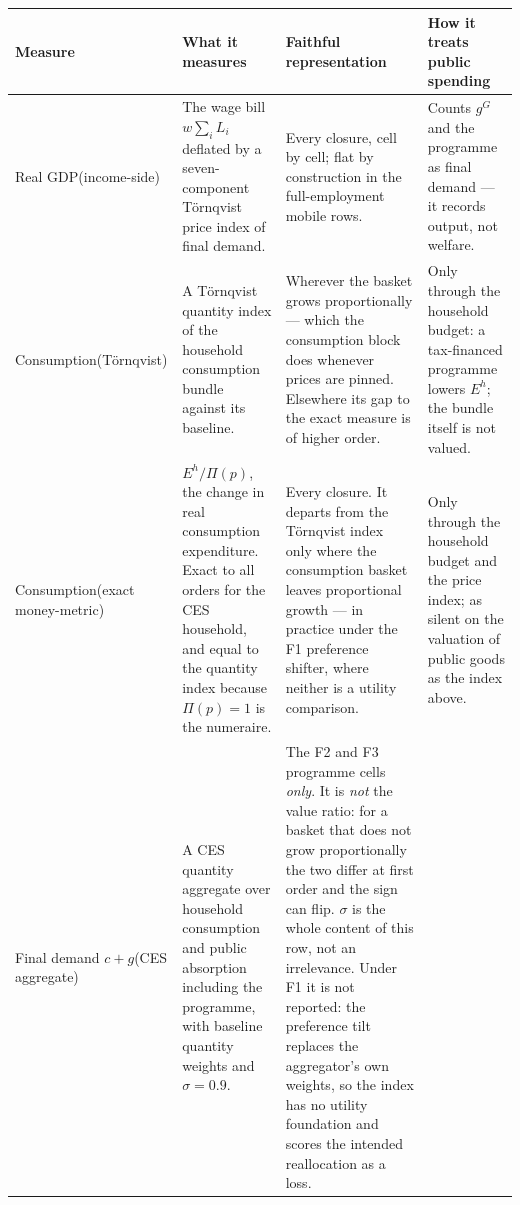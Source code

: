 \begin{table}[htbp]
\centering
\footnotesize
\setlength{\tabcolsep}{3pt}
\renewcommand{\arraystretch}{1.25}
\begin{tabular}{@{}>{\raggedright\arraybackslash}p{1.85cm}>{\raggedright\arraybackslash}p{3.9cm}>{\raggedright\arraybackslash}p{4.3cm}>{\raggedright\arraybackslash}p{4.3cm}@{}}
\toprule
\textbf{Measure} & \textbf{What it measures} & \textbf{Faithful representation} & \textbf{How it treats public spending} \\
\midrule
Real GDP\newline \scriptsize (income-side)
& The wage bill $w\sum_i L_i$ deflated by a seven-component T\"ornqvist price index of final demand.
& Every closure, cell by cell; flat by construction in the full-employment mobile rows.
& Counts $g^G$ and the programme as final demand --- it records output, not welfare. \\
Consumption\newline \scriptsize (T\"ornqvist)
& A T\"ornqvist quantity index of the household consumption bundle against its baseline.
& Wherever the basket grows proportionally --- which the consumption block does whenever prices are pinned. Elsewhere its gap to the exact measure is of higher order.
& Only through the household budget: a tax-financed programme lowers $E^h$; the bundle itself is not valued. \\
Consumption\newline \scriptsize (exact money-metric)
& $E^h/\Pi(p)$, the change in real consumption expenditure. Exact to all orders for the CES household, and equal to the quantity index because $\Pi(p)=1$ is the numeraire.
& Every closure. It departs from the T\"ornqvist index only where the consumption basket leaves proportional growth --- in practice under the F1 preference shifter, where neither is a utility comparison.
& Only through the household budget and the price index; as silent on the valuation of public goods as the index above. \\
Final demand $c+g$\newline \scriptsize (CES aggregate)
& A CES quantity aggregate over household consumption and public absorption including the programme, with baseline quantity weights and $\sigma=0.9$.
& The F2 and F3 programme cells \emph{only}. It is \emph{not} the value ratio: for a basket that does not grow proportionally the two differ at first order and the sign can flip. $\sigma$ is the whole content of this row, not an irrelevance. Under F1 it is not reported: the preference tilt replaces the aggregator's own weights, so the index has no utility foundation and scores the intended reallocation as a loss.

\end{tabular}
\end{table}

